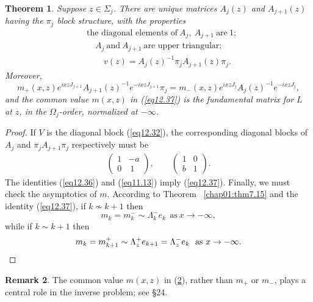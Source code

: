 \documentclass{surv-l}
\theoremstyle{plain}
\newtheorem{theorem}{Theorem}[section]
\theoremstyle{definition}
\newtheorem{remark}[theorem]{Remark}
\numberwithin{equation}{chapter}
\begin{document}
\begin{theorem}\label{thm12.33}
Suppose $z\in\Sigma_{j}$. There are unique matrices $A_{j}(z)$ and $A_{j+1}(z)$ having the $\pi_{j}$ block structure, with the properties
\setcounter{equation}{33}
\begin{align}\label{eq12.34}
 & \text{the diagonal elements of}\ A_{j},\ A_{j+1}\ \text{are}\ 1; \\\label{eq12.35}
 & \quad A_{j}\ \text{and}\ A_{j+1}\ \text{are upper triangular};\\\label{eq12.36}
 & \quad\quad v(z)=A_{j}(z)^{-1}\pi_{j}A_{j+1}(z)\pi_{j}.
\end{align}
Moreover,
\begin{equation}\label{eq12.37}
m_{+}(x, z)e^{ixzJ_{j+1}}A_{j+1}(z)^{-1}e^{-ixzJ_{j+1}}\pi_{j}=m_{-}(x, z)e^{ixzJ_{j}}A_{j}(z)^{-1}e^{-ixzJ_{j}},
\end{equation}
and the common value $m(x, z)$ in \emph{(\ref{eq12.37})} is the fundamental matrix for $L$ at $z$, in the $\Omega_{j}$-order, normalized at $-\infty$.
\end{theorem}

\begin{proof}
 If $V$ is the diagonal block (\ref{eq12.32}), the corresponding diagonal blocks of $A_{j}$ and $\pi_{j}A_{j+1}\pi_{j}$ respectively must be
\begin{align*}
\left(\begin{array}{ll}
1 & -a\\
0 & {\ 1}
\end{array}\right),\qquad \left(\begin{array}{ll}
1 & 0\\
b & 1
\end{array}\right).
\end{align*}
The identities (\ref{eq12.36}) and (\ref{eq11.13}) imply (\ref{eq12.37}). Finally, we must check the asymptotics of $m$. According to Theorem ~\ref{chap01:thm7.15} and the identity (\ref{eq12.37}), if $ k\nsim k+1$ then
\begin{equation*}
m_{k}=m_{k}^{-}\sim\Lambda_{k}^{-}e_{k}\ \ \mathrm{as}\  x\rightarrow-\infty,
\end{equation*}
while if $k\sim k+1$ then
\begin{equation*}
m_{k}=m_{k+1}^{+}\sim\Lambda_{z}^{+}e_{k+1}=\Lambda_{z}^{-}e_{k}\ \ \mathrm{as}\  x\rightarrow-\infty.\qedhere
\end{equation*}
 \end{proof}
\setcounter{theorem}{37}
\begin{remark}\label{rem12.38}
The common value $m(x, z)$ in (\ref{rem12.38}), rather than $m_{+}$ or $m_{-}$, plays a central role in the inverse problem; see \S24.
\end{remark}
\end{document}
